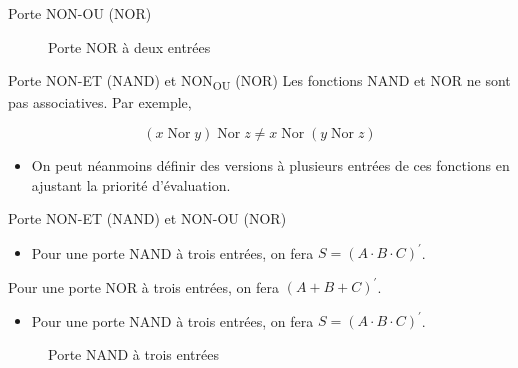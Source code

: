 \documentclass[presentation]{beamer}
\begin{document}
\begin{frame}[label={sec:org7f1d1b8}]{Porte NON-OU (NOR)}
\begin{figure}[htbp]
\centering

\caption{\label{fig:orgf7fd24d}Porte NOR à deux entrées}
\end{figure}
\end{frame}

\begin{frame}[label={sec:org32a02cf}]{Porte NON-ET (NAND) et NON\textsubscript{OU} (NOR)}
Les fonctions NAND et NOR ne sont pas associatives. Par exemple,

$$
(x \operatorname{Nor} y) \operatorname{Nor} z \neq x \operatorname{Nor} (y \operatorname{Nor} z) 
$$

\begin{itemize}
\item On peut néanmoins définir des versions à plusieurs entrées de ces fonctions en ajustant la priorité d'évaluation.
\end{itemize}
\end{frame}

\begin{frame}[label={sec:org638783d}]{Porte NON-ET (NAND) et NON-OU (NOR)}
\begin{itemize}
\item Pour une porte NAND à trois entrées, on fera \(S = (A \cdot B \cdot C)^\prime\).
\end{itemize}

Pour une porte NOR à trois entrées, on fera \((A + B + C)^\prime\).



\begin{itemize}
\item Pour une porte NAND à trois entrées, on fera \(S = (A \cdot B \cdot C)^\prime\).
\end{itemize}

\begin{figure}[htbp]
\centering

\caption{\label{fig:org73916ae}Porte NAND à trois entrées}
\end{figure}
\end{frame}
\end{document}
